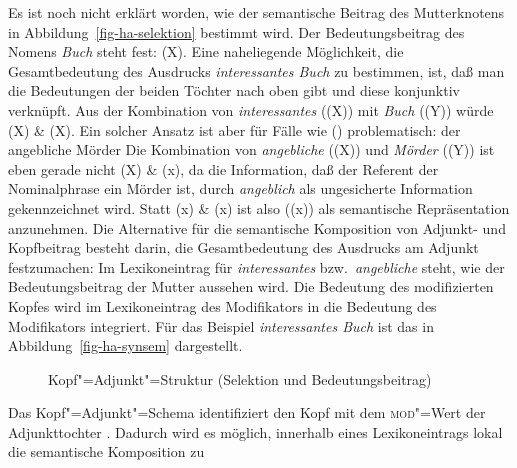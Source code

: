 Es ist noch nicht erklärt worden, wie der semantische Beitrag des Mutterknotens in
Abbildung~\ref{fig-ha-selektion} bestimmt wird. Der Bedeutungsbeitrag des Nomens
\emph{Buch} steht fest: (X). Eine naheliegende Möglichkeit, die Gesamtbedeutung
des Ausdrucks \emph{interessantes Buch} zu bestimmen, ist, daß man die Bedeutungen 
der beiden Töchter nach oben gibt und diese konjunktiv verknüpft.
Aus der Kombination von \emph{interessantes} ((X)) mit \emph{Buch} ((Y))
würde (X) \& (X). Ein solcher Ansatz ist aber für Fälle wie ()
problematisch:
\ea
der angebliche Mörder
\z
Die Kombination von \emph{angebliche} ((X)) und {\em Mörder\/} ((Y)) ist eben
gerade nicht (X) \& (x), da die Information, daß der Referent der Nominalphrase
ein Mörder ist, durch \emph{angeblich} als ungesicherte Information gekennzeichnet wird.
Statt (x) \& (x) ist also ((x)) als semantische Repräsentation
anzunehmen.
Die Alternative für die semantische Komposition von Adjunkt- und Kopfbeitrag
besteht darin, die Gesamtbedeutung des Ausdrucks am Adjunkt festzumachen:
Im Lexikoneintrag für \emph{interessantes} bzw.\ \emph{angebliche}
steht, wie der Bedeutungsbeitrag der Mutter aussehen wird.
Die Bedeutung des modifizierten Kopfes wird im Lexikoneintrag des Modifikators 
in die Bedeutung des Modifikators integriert. Für das Beispiel \emph{interessantes Buch} ist das
in Abbildung~\vref{fig-ha-synsem} dargestellt.
\begin{figure}
\caption{\label{fig-ha-synsem}Kopf"=Adjunkt"=Struktur (Selektion und Bedeutungsbeitrag)}
\end{figure}
Das Kopf"=Adjunkt"=Schema identifiziert den Kopf mit dem \textsc{mod}"=Wert der Adjunkttochter .
Dadurch wird es möglich, innerhalb eines Lexikoneintrags lokal die semantische Komposition zu
